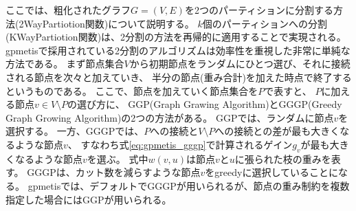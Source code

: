 
ここでは、粗化されたグラフ$G=(V,E)$を2つのパーティションに分割する方法(2WayPartiotion関数)について説明する。
$k$個のパーティションへの分割(KWayPartiotion関数)は、2分割の方法を再帰的に適用することで実現される。
gpmetisで採用されている2分割のアルゴリズムは効率性を重視した非常に単純な方法である。
まず節点集合$V$から初期節点をランダムにひとつ選び、それに接続される節点を次々と加えていき、
半分の節点(重み合計)を加えた時点で終了するというものである。
ここで、節点を加えていく節点集合を$P$で表すと、
$P$に加える節点$v\in V\setminus P$の選び方に、
GGP(Graph Grawing Algorithm)とGGGP(Greedy Graph Growing Algorithm)の2つの方法がある。
GGPでは、ランダムに節点$v$を選択する。
一方、GGGPでは、$P$への接続と$V\setminus P$への接続との差が最も大きくなるような節点$v$、
すなわち式\ref{eq:gpmetis_gggp}で計算されるゲイン$g_v$が最も大きくなるような節点$v$を選ぶ。
式中$w(v,u)$は節点$v$と$u$に張られた枝の重みを表す。
GGGPは、カット数を減らすような節点$v$をgreedyに選択していることになる。
gpmetisでは、デフォルトでGGGPが用いられるが、節点の重み制約を複数指定した場合にはGGPが用いられる。



